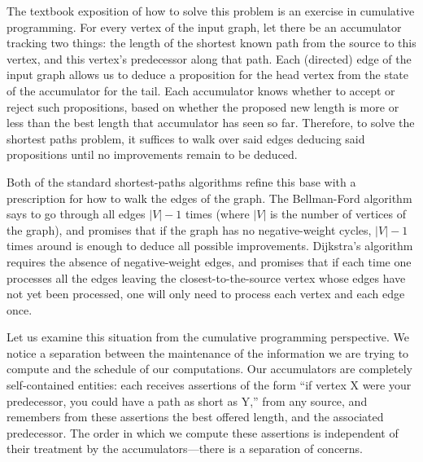 \documentclass[12pt]{article}
\begin{document}
The textbook exposition of how to solve this problem is an exercise in
cumulative programming.  For every vertex of the input graph, let
there be an accumulator tracking two things: the length of the
shortest known path from the source to this vertex, and this vertex's
predecessor along that path.  Each (directed) edge of the input graph
allows us to deduce a proposition for the head vertex from the state
of the accumulator for the tail.  Each accumulator knows whether to
accept or reject such propositions, based on whether the proposed new
length is more or less than the best length that accumulator has seen
so far.  Therefore, to solve the shortest paths problem, it suffices
to walk over said edges deducing said propositions until no
improvements remain to be deduced.

Both of the standard shortest-paths algorithms refine this base with a
prescription for how to walk the edges of the graph.  The Bellman-Ford
algorithm says to go through all edges $|V|-1$ times (where $|V|$ is
the number of vertices of the graph), and promises that if the graph
has no negative-weight cycles, $|V|-1$ times around is enough to
deduce all possible improvements.  Dijkstra's algorithm requires the
absence of negative-weight edges, and promises that if each time one
processes all the edges leaving the closest-to-the-source vertex whose
edges have not yet been processed, one will only need to process each
vertex and each edge once.

Let us examine this situation from the cumulative programming
perspective.  We notice a separation between the maintenance of the
information we are trying to compute and the schedule of our
computations.  Our accumulators are completely self-contained
entities: each receives assertions of the form ``if vertex X were your
predecessor, you could have a path as short as Y,'' from any source,
and remembers from these assertions the best offered length, and the
associated predecessor.  The order in which we compute these
assertions is independent of their treatment by the
accumulators---there is a separation of concerns.
\end{document}
